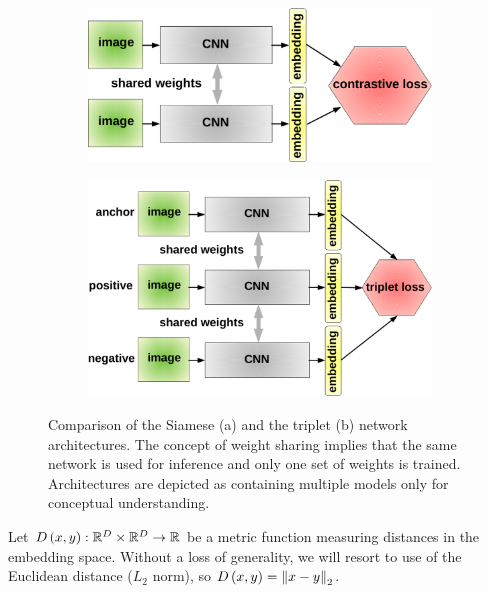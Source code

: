 \begin{figure}[t]
    \centering
    \begin{subfigure}[b]{0.49\textwidth}
        \centering
        \includegraphics[width=\textwidth]{figures/theoretical_foundations/siamese_architecture.pdf}
        \caption[]{}
    \end{subfigure}
    \hfill
    \begin{subfigure}[b]{0.49\textwidth}
        \centering
        \includegraphics[width=\textwidth]{figures/theoretical_foundations/triplet_architecture.pdf}
        \caption[]{}
    \end{subfigure}
    \caption[Contrastive and triplet loss]{Comparison of the Siamese (a) and the triplet (b) network architectures. The concept of weight sharing implies that the same network is used for inference and only one set of weights is trained. Architectures are depicted as containing multiple models only for conceptual understanding.}
    \label{fig:SiameseAndTripletArchitectures}
\end{figure}

Let ${D} \left( x, y \right): \mathbb{R}^D \times \mathbb{R}^D \to \mathbb{R}$ be a metric function measuring distances in the embedding space. Without a loss of generality, we will resort to use of the Euclidean distance ($L_2$ norm), so ${D} \left( x, y \right) = {\left\Vert {x - y} \right\Vert}_2$.

